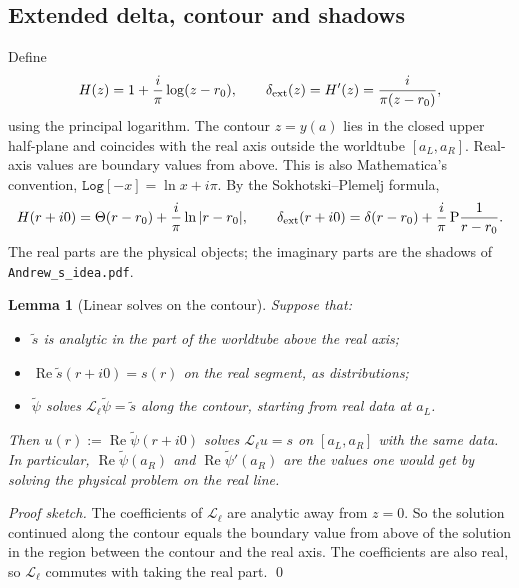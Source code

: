 \documentclass[11pt,a4paper]{article}
\renewcommand{\Re}{\operatorname{Re}}
\newcommand{\dext}{\delta_{\rm ext}}
\newcommand{\Lop}{\mathcal{L}_\ell}
\newcommand{\nb}[1]{\nolinkurl{#1}}
\newcommand{\code}[1]{\texttt{#1}}
\newtheorem{lemma}{Lemma}
\begin{document}
\subsection{Extended delta, contour and shadows}
Define
\begin{equation}
H(z)=1+\frac{i}{\pi}\log(z-r_0),\qquad \dext(z)=H'(z)=\frac{i}{\pi(z-r_0)},
\end{equation}
using the principal logarithm.
The contour $z=y(a)$ lies in the closed upper half-plane and coincides with the real axis outside the worldtube $[a_L,a_R]$.
Real-axis values are boundary values from above.
This is also Mathematica's convention, $\code{Log}[-x]=\ln x+i\pi$.
By the Sokhotski--Plemelj formula,
\begin{equation}
H(r+i0)=\Theta(r-r_0)+\frac{i}{\pi}\ln|r-r_0|,\qquad
\dext(r+i0)=\delta(r-r_0)+\frac{i}{\pi}\,\mathrm{P}\frac{1}{r-r_0}.
\label{eq:SP}
\end{equation}
The real parts are the physical objects; the imaginary parts are the shadows of \nb{Andrew_s_idea.pdf}.

\begin{lemma}[Linear solves on the contour]\label{lem:linear}
Suppose that:
\begin{itemize}[nosep]
\item $\tilde s$ is analytic in the part of the worldtube above the real axis;
\item $\Re\tilde s(r+i0)=s(r)$ on the real segment, as distributions;
\item $\tilde\psi$ solves $\Lop\tilde\psi=\tilde s$ along the contour, starting from real data at $a_L$.
\end{itemize}
Then $u(r):=\Re\tilde\psi(r+i0)$ solves $\Lop u=s$ on $[a_L,a_R]$ with the same data.
In particular, $\Re\tilde\psi(a_R)$ and $\Re\tilde\psi'(a_R)$ are the values one would get by solving the physical problem on the real line.
\end{lemma}
\noindent\emph{Proof sketch.}
The coefficients of $\Lop$ are analytic away from $z=0$.
So the solution continued along the contour equals the boundary value from above of the solution in the region between the contour and the real axis.
The coefficients are also real, so $\Lop$ commutes with taking the real part. \qed
\end{document}
